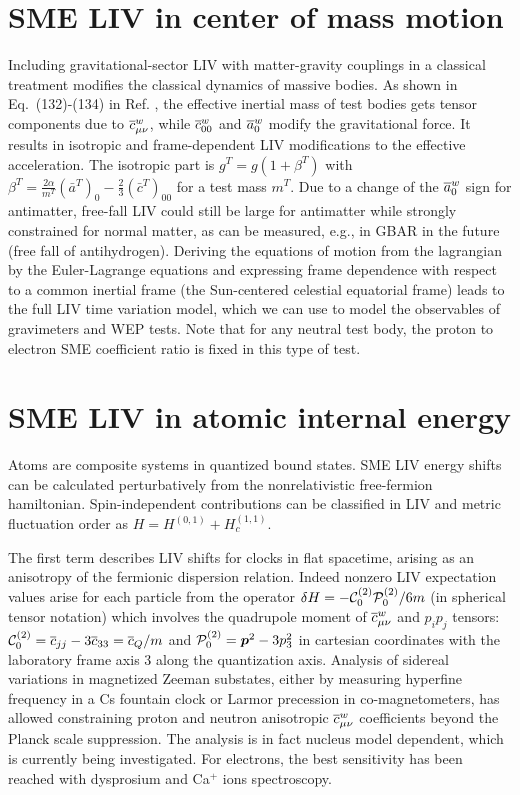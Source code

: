 \documentclass{ws-procs9x6-cpt16}
\begin{document}
\section{SME LIV in center of mass motion}\label{sec2}

Including gravitational-sector LIV with matter-gravity couplings
in a classical treatment modifies the classical dynamics of massive bodies. As shown in
Eq.\ (132)-(134) in Ref. ,
the effective inertial mass of test bodies gets tensor components due to $\overline{c}^w_{\mu\nu}$, while
$\overline{c}^w_{\mathrm{00}}$ and $\overline{a}^w_{\mathrm{0}}$ modify the gravitational
force. It results in isotropic and frame-dependent LIV modifications
to the effective acceleration. The isotropic part is $g^T=g(1+\beta^T)$ with
$\beta^T=\tfrac{2\alpha}{m^T}(\bar a^T)_0-\tfrac{2}{3}(\bar c^T)_{00}$ for
a test mass $m^T$. Due to a change of the $\overline{a}^w_0$ sign for antimatter, 
free-fall LIV could still be large for antimatter while strongly
constrained for normal matter,\cite{Tasson2014} as can be measured,
e.g., in GBAR in the future (free fall of antihydrogen).\cite{Perez2012} Deriving the equations of motion from the lagrangian by the Euler-Lagrange
equations and expressing frame dependence with respect to a common
inertial frame (the Sun-centered celestial equatorial frame) leads to the full LIV time variation model, which we can 
use to model the observables of gravimeters and WEP 
tests.\cite{Kostelecky2011} Note that for any neutral test body,
the proton to electron SME coefficient ratio is fixed in this type of test.


\section{SME LIV in atomic internal energy}\label{sec3}

Atoms are composite systems in quantized
bound states. SME LIV energy shifts can be calculated perturbatively
from the nonrelativistic free-fermion hamiltonian. Spin-independent
contributions can be classified in LIV and metric
fluctuation order as\cite{Kostelecky2011} $ H=H^{(0,1)}+H^{(1,1)}_c$.

The first term describes LIV shifts for clocks in flat
spacetime,\cite{BluhmLane} arising
as an anisotropy of the fermionic dispersion relation. Indeed nonzero
LIV expectation
values arise for each particle from the operator $\delta H=-{\cal C}^{(2)}_0 {\cal
  P}^{(2)}_0/6m$ (in spherical tensor notation) which involves
the quadrupole moment of $\overline{c}^w_{\mu\nu}$ and $p_ip_j$ tensors: ${\cal
  C}^{(2)}_0=\overline{c}_{jj}-3\overline{c}_{33}=\overline{c}_Q/m$ and ${\cal P}^{(2)}_0={\mbox{\boldmath$p$}}^2-3p_3^2$
in cartesian coordinates with the laboratory frame axis $3$ along the
quantization axis. 
Analysis of sidereal variations in magnetized Zeeman substates,
either by measuring hyperfine
frequency in a Cs fountain clock\cite{Wolf2006} or Larmor
precession in co-magnetometers,\cite{Smiciklas2011} has allowed constraining proton
and neutron anisotropic $\overline{c}^w_{\mu\nu}$ coefficients beyond the Planck scale suppression. The analysis is in fact nucleus model dependent, which is
currently being investigated.\cite{BrownFlambaum} For electrons, the best sensitivity
has been reached with dysprosium\cite{Hohensee2013} and
Ca$^+$ ions\cite{Pruttivarasin2015} spectroscopy.
\end{document}
